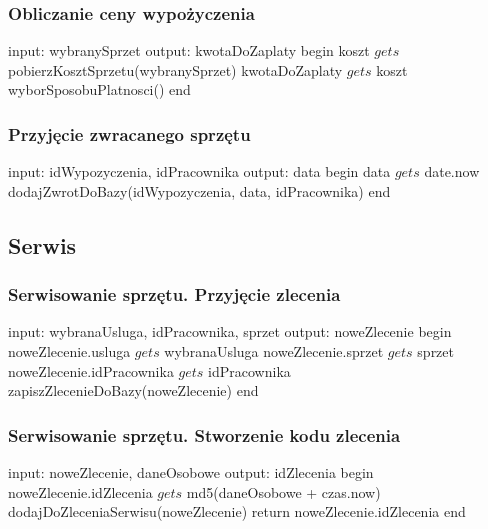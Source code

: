 \subsubsection{Obliczanie ceny wypożyczenia}
\begin{algorithm}[caption={4.2 Obliczanie ceny wypożyczenia}, label={alg1}]
  input: wybranySprzet
  output: kwotaDoZaplaty
begin
  koszt $gets$ pobierzKosztSprzetu(wybranySprzet)
  kwotaDoZaplaty $gets$ koszt
  wyborSposobuPlatnosci()
end
\end{algorithm}

\subsubsection{Przyjęcie zwracanego sprzętu}
\begin{algorithm}[caption={4.3 Przyjęcie zwracanego sprzętu}, label={alg1}]
  input: idWypozyczenia, idPracownika
  output: data
begin
  data $gets$ date.now
  dodajZwrotDoBazy(idWypozyczenia, data, idPracownika)
end
\end{algorithm}

\subsection{Serwis}
\subsubsection{Serwisowanie sprzętu. Przyjęcie zlecenia}
\begin{algorithm}[caption={5.1.1 Serwisowanie sprzętu. Przyjęcie zlecenia}, label={alg1}]

  input: wybranaUsluga, idPracownika, sprzet
  output: noweZlecenie
begin
  noweZlecenie.usluga $gets$ wybranaUsluga
  noweZlecenie.sprzet $gets$ sprzet
  noweZlecenie.idPracownika $gets$ idPracownika
  zapiszZlecenieDoBazy(noweZlecenie)
end
\end{algorithm}

\subsubsection{Serwisowanie sprzętu. Stworzenie kodu zlecenia}
\begin{algorithm}[caption={5.1.2 Serwisowanie sprzętu. Stworzenie kodu zlecenia}, label={alg1}]
  input: noweZlecenie, daneOsobowe
  output: idZlecenia
begin
  noweZlecenie.idZlecenia $gets$ md5(daneOsobowe + czas.now)
  dodajDoZleceniaSerwisu(noweZlecenie)
  return noweZlecenie.idZlecenia
end
\end{algorithm}

